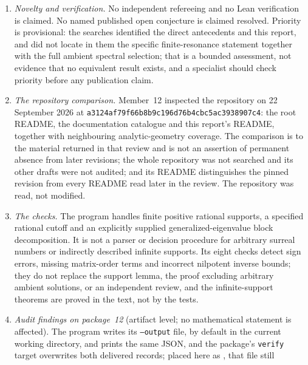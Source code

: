 \documentclass[11pt,letterpaper]{article}
\numberwithin{equation}{section}
\theoremstyle{definition}
\theoremstyle{remark}
\newcommand{\CommitC}{\nolinkurl{a3124af79f66b8b9c196d76b4cbc5ac3938907c4}}
\begin{document}
\begin{enumerate}[label=\textup{N\arabic*.},leftmargin=3.0em,itemsep=0.35em,start=65]
this report (\cref{diff:rs:lem:eulermode}). None is relabelled as new. Member~12
proposes as its contribution only the finite-resonance support theorem, the
constructive normal form with support and finite-monomial certificates, and the
exact comparison of Hahn and full-surcomplex solutions and morphisms; general
theorems about generalized-series differential modules may imply parts of the
construction in other terminology.
\item \emph{Novelty and verification.} No independent refereeing and no Lean
verification is claimed. No named published open conjecture is claimed resolved.
Priority is provisional: the searches identified the direct antecedents
\cite{BM,ADH,Levelt,KW,vdH} and this report, and did not locate in them the
specific finite-resonance statement together with the full ambient spectral
selection; that is a bounded assessment, not evidence that no equivalent result
exists, and a specialist should check priority before any publication claim.
\item \emph{The repository comparison.} Member~12 inspected the repository on
22 September 2026 at \CommitC: the root README, the documentation catalogue and
this report's README, together with neighbouring analytic-geometry coverage. The
comparison is to the material returned in that review and is not an assertion of
permanent absence from later revisions; the whole repository was not searched
and its other drafts were not audited; and its README distinguishes the pinned
revision from every README read later in the review. The repository was read,
not modified.
\item \emph{The checks.} The program handles finite positive rational
supports, a specified rational cutoff and an explicitly supplied
generalized-eigenvalue block decomposition. It is not a parser or decision
procedure for arbitrary surreal numbers or indirectly described infinite
supports. Its eight checks detect sign errors, missing matrix-order terms and
incorrect nilpotent inverse bounds; they do not replace the support lemma, the
proof excluding arbitrary ambient solutions, or an independent review, and the
infinite-support theorems are proved in the text, not by the tests.
\item \emph{Audit findings on package~12} (artifact level; no mathematical
statement is affected). The program writes its \texttt{--output} file, by
default  in the current working directory, and prints
the same JSON, and the package's \texttt{verify} target overwrites both delivered
records; placed here as , that file still

\end{enumerate}
\end{document}

